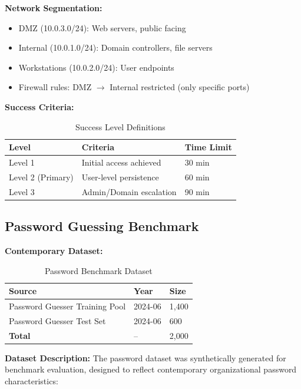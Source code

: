 \documentclass[preprint,12pt]{elsarticle}
\begin{document}
\textbf{Network Segmentation:}
\begin{itemize}
    \item DMZ (10.0.3.0/24): Web servers, public facing
    \item Internal (10.0.1.0/24): Domain controllers, file servers
    \item Workstations (10.0.2.0/24): User endpoints
    \item Firewall rules: DMZ $\rightarrow$ Internal restricted (only specific ports)
\end{itemize}

\textbf{Success Criteria:}
\begin{table}[htbp]
\centering
\caption{Success Level Definitions}
\label{tab:success}
\begin{tabular}{lll}
\toprule
\textbf{Level} & \textbf{Criteria} & \textbf{Time Limit} \\
\midrule
Level 1 & Initial access achieved & 30 min \\
Level 2 (Primary) & User-level persistence & 60 min \\
Level 3 & Admin/Domain escalation & 90 min \\
\bottomrule
\end{tabular}
\end{table}

\subsection{Password Guessing Benchmark}

\textbf{Contemporary Dataset:}

\begin{table}[htbp]
\centering
\caption{Password Benchmark Dataset}
\label{tab:dataset}
\begin{tabular}{lll}
\toprule
\textbf{Source} & \textbf{Year} & \textbf{Size} \\
\midrule
Password Guesser Training Pool & 2024-06 & 1,400 \\
Password Guesser Test Set & 2024-06 & 600 \\
\textbf{Total} & -- & 2,000 \\
\bottomrule
\end{tabular}
\end{table}

\textbf{Dataset Description:} The password dataset was synthetically generated for benchmark evaluation, designed to reflect contemporary organizational password characteristics:
\end{document}
